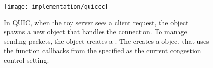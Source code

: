 \begin{figure}[h]
\centering
\texttt{[image: implementation/quiccc]}
\caption{In QUIC, when the toy server sees a client request, the  object spawns a new  object that handles the connection. To manage sending packets, the  object creates a . The  creates a  object that uses the function callbacks from the  specified as the current congestion control setting.}
\label{fig:quiccc_diagram}
\end{figure}
